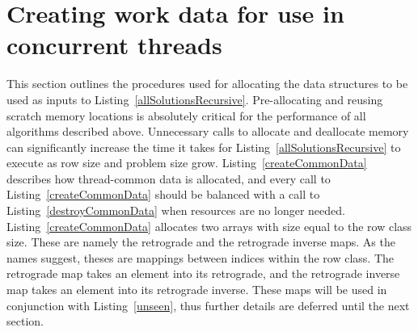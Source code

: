 \section{Creating work data for use in concurrent threads}

This section outlines the procedures used for allocating the data structures to be used as inputs to Listing~\ref{allSolutionsRecursive}. Pre-allocating and reusing scratch memory locations is absolutely critical for the performance of all algorithms described above. Unnecessary calls to allocate and deallocate memory can significantly increase the time it takes for Listing~\ref{allSolutionsRecursive} to execute as row size and problem size grow. Listing~\ref{createCommonData} describes how thread-common data is allocated, and every call to Listing~\ref{createCommonData} should be balanced with a call to Listing~\ref{destroyCommonData} when resources are no longer needed. Listing~\ref{createCommonData} allocates two arrays with size equal to the row class size. These are namely the retrograde and the retrograde inverse maps. As the names suggest, theses are mappings between indices within the row class. The retrograde map takes an element into its retrograde, and the retrograde inverse map takes an element into its retrograde inverse. These maps will be used in conjunction with Listing~\ref{unseen}, thus further details are deferred until the next section.

